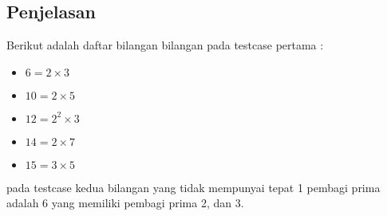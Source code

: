 \documentclass{article}
\begin{document}
\subsection*{Penjelasan}
Berikut adalah daftar bilangan bilangan pada testcase pertama :
\begin{itemize}
    \item $6  = 2   \times 3$
    \item $10 = 2   \times 5$
    \item $12 = 2^2 \times 3$
    \item $14 = 2   \times 7$
    \item $15 = 3   \times 5$
\end{itemize}
pada testcase kedua bilangan yang tidak mempunyai tepat 1 pembagi prima adalah 6 yang memiliki pembagi prima 2, dan 3.

\pagebreak
\end{document}
